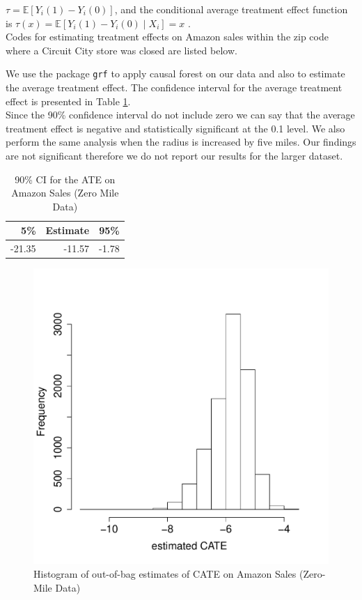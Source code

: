 \documentclass{article}
\begin{document}
$\tau = \mathbb{E} [Y_i(1)-Y_i(0)]$, and the conditional average
treatment effect function is 
$\tau(x)=\mathbb{E}[ Y_i(1)-Y_i(0)\mid X_i] =x$ .\\
Codes for estimating treatment effects  on Amazon sales within the zip code where a Circuit City store was closed are listed below.

We use the package \texttt{grf} \cite{tibshirani2018package} to apply causal forest on our data and also to estimate the average treatment effect. The confidence interval for the average treatment effect is presented in Table \ref{tab:ama_cf1_ate}. \\
Since the 90\% confidence interval do not include zero we can say that the average treatment effect is negative and statistically significant at the 0.1 level. We also perform the same analysis when the radius is increased by five miles. Our findings are not significant therefore we do not report our results for the larger dataset.
\begin{table}[h]
	\caption{90\% CI for the ATE on Amazon Sales (Zero Mile Data)} 
	\label{tab:ama_cf1_ate}
	\vspace{1em}
	\centering
	\begin{tabular}{rrr}
		\hline
		5\%  & Estimate & 95\% \\ 
		\hline
		-21.35 & -11.57 & -1.78 \\ 
		\hline
	\end{tabular}
\end{table}

\begin{figure}[h]
	\centering
	\includegraphics[width=0.5\linewidth]{pic/tauhat1_ama_hist.pdf}\caption{Histogram of out-of-bag estimates of CATE  on Amazon Sales (Zero-Mile Data)}\label{fig:tauhat1_ama_hist}
\end{figure}
\end{document}
